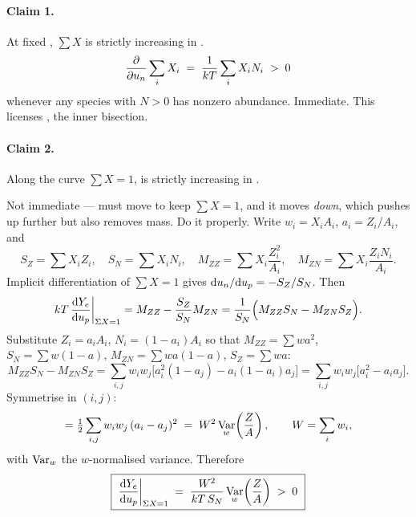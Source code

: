 \paragraph{Claim 1.} At fixed \up, $\sum X$ is strictly increasing in \un.
%
\begin{equation}
\frac{\partial}{\partial u_{n}}\sum_i X_i \;=\; \frac{1}{kT}\sum_i X_iN_i \;>\;0
\label{eq:claim1}
\end{equation}
%
whenever any species with $N > 0$ has nonzero abundance. Immediate. This
licenses , the inner bisection.

\paragraph{Claim 2.} Along the curve $\sum X = 1$, \Ye{} is strictly increasing
in \up.

Not immediate --- \un{} must move to keep $\sum X = 1$, and it moves
\emph{down}, which pushes \Ye{} up further but also removes mass. Do it
properly. Write $w_i = X_iA_i$, $a_i = Z_i/A_i$, and
%
\begin{equation}
S_Z=\sum X_iZ_i,\quad S_N=\sum X_iN_i,\quad
M_{ZZ}=\sum X_i\frac{Z_i^2}{A_i},\quad
M_{ZN}=\sum X_i\frac{Z_iN_i}{A_i}.
\label{eq:moments}
\end{equation}
%
Implicit differentiation of $\sum X = 1$ gives $\mathrm{d}u_{n}/\mathrm{d}u_{p} = -S_Z/S_N$. Then
%
\begin{equation}
kT\,\frac{\mathrm{d}Y_{e}}{\mathrm{d}u_{p}}\bigg|_{\Sigma X=1}
= M_{ZZ} - \frac{S_Z}{S_N}M_{ZN}
= \frac{1}{S_N}\Bigl(M_{ZZ}S_N - M_{ZN}S_Z\Bigr).
\label{eq:dyedup1}
\end{equation}
%
Substitute $Z_i = a_iA_i$, $N_i = (1-a_i)A_i$ so that $M_{ZZ} = \sum w a^2$,
$S_N = \sum w(1-a)$, $M_{ZN} = \sum w a(1-a)$, $S_Z = \sum w a$:
%
\begin{equation}
M_{ZZ}S_N - M_{ZN}S_Z
= \sum_{i,j} w_iw_j\bigl[a_i^2(1-a_j) - a_i(1-a_i)a_j\bigr]
= \sum_{i,j} w_iw_j\bigl[a_i^2 - a_ia_j\bigr].
\label{eq:dyedup2}
\end{equation}
%
Symmetrise in $(i, j)$:
%
\begin{equation}
= \tfrac12\sum_{i,j} w_iw_j\,(a_i-a_j)^2
\;=\; W^2\operatorname*{Var}_w\!\left(\frac{Z}{A}\right),
\qquad W=\sum_i w_i,
\label{eq:dyedup3}
\end{equation}
%
with $\operatorname*{Var}_w$ the $w$-normalised variance. Therefore
%
\begin{equation}
\boxed{\ \frac{\dd\Ye}{\dd\up}\bigg|_{\Sigma X=1}
\;=\; \frac{W^2}{kT\,S_N}\Var_w\!\left(\frac{Z}{A}\right) \;>\; 0\ }
\label{eq:monotonicity}
\end{equation}
\derivedhere

